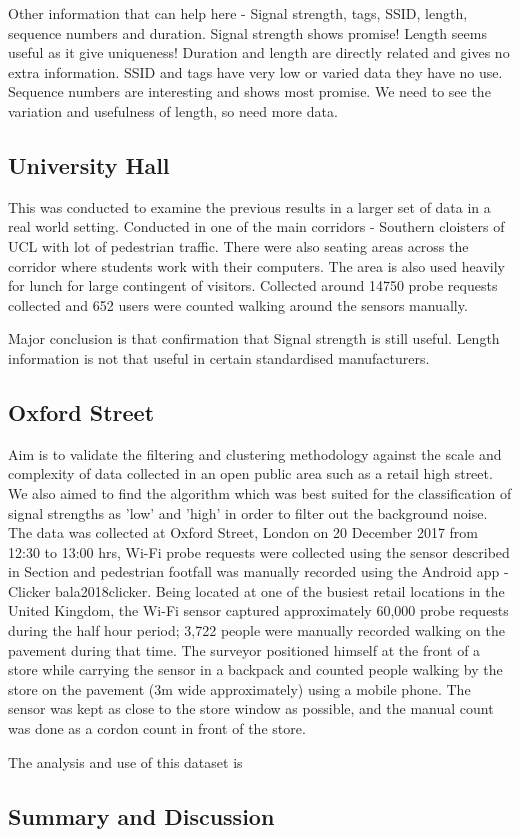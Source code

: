 Other information that can help here - Signal strength, tags, SSID, length, sequence numbers and duration.
Signal strength shows promise!
Length seems useful as it give uniqueness!
Duration and length are directly related and gives no extra information.
SSID and tags have very low or varied data they have no use.
Sequence numbers are interesting and shows most promise.
We need to see the variation and usefulness of length, so need more data.

\subsection{University Hall}
This was conducted to examine the previous results in a larger set of data in a real world setting.
Conducted in one of the main corridors - Southern cloisters of UCL with lot of pedestrian traffic.
There were also seating areas across the corridor where students work with their computers.
The area is also used heavily for lunch for large contingent of visitors.
Collected around 14750 probe requests collected and 652 users were counted walking around the sensors manually.

Major conclusion is that confirmation that Signal strength is still useful.
Length information is not that useful in certain standardised manufacturers.

\subsection{Oxford Street}

Aim is to validate the filtering and clustering methodology against the scale and complexity of data collected in an open public area such as a retail high street.
We also aimed to find the algorithm which was best suited for the classification of signal strengths as 'low' and 'high' in order to filter out the background noise.
The data was collected at Oxford Street, London on 20 December 2017 from 12:30 to 13:00 hrs, Wi-Fi probe requests were collected using the sensor described in Section and pedestrian footfall was manually recorded using the Android app - Clicker bala2018clicker.
Being located at one of the busiest retail locations in the United Kingdom, the Wi-Fi sensor captured approximately 60,000 probe requests during the half hour period; 3,722 people were manually recorded walking on the pavement during that time.
The surveyor positioned himself at the front of a store while carrying the sensor in a backpack and counted people walking by the store on the pavement (3m wide approximately) using a mobile phone.
The sensor was kept as close to the store window as possible, and the manual count was done as a cordon count in front of the store.

The analysis and use of this dataset is 

\subsection{Summary and Discussion}
